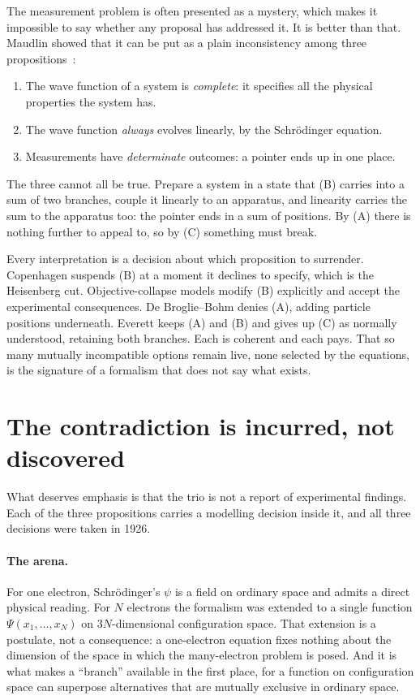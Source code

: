 \documentclass[11pt]{article}
\begin{document}
The measurement problem is often presented as a mystery, which makes it impossible to say whether
any proposal has addressed it. It is better than that. Maudlin showed that it can be put as a
plain inconsistency among three propositions~\cite{Maudlin1995}:

\begin{enumerate}\itemsep3pt
\item[(A)] The wave function of a system is \emph{complete}: it specifies all the physical
properties the system has.
\item[(B)] The wave function \emph{always} evolves linearly, by the Schr\"odinger equation.
\item[(C)] Measurements have \emph{determinate} outcomes: a pointer ends up in one place.
\end{enumerate}

The three cannot all be true. Prepare a system in a state that (B) carries into a sum of two
branches, couple it linearly to an apparatus, and linearity carries the sum to the apparatus too:
the pointer ends in a sum of positions. By (A) there is nothing further to appeal to, so by (C)
something must break.

Every interpretation is a decision about which proposition to surrender. Copenhagen suspends (B)
at a moment it declines to specify, which is the Heisenberg cut. Objective-collapse models modify
(B) explicitly and accept the experimental consequences. De Broglie--Bohm denies (A), adding
particle positions underneath. Everett keeps (A) and (B) and gives up (C) as normally understood,
retaining both branches. Each is coherent and each pays. That so many mutually incompatible options
remain live, none selected by the equations, is the signature of a formalism that does not say what
exists.

\section{The contradiction is incurred, not discovered}\label{sec:incurred}

What deserves emphasis is that the trio is not a report of experimental findings. Each of the three
propositions carries a modelling decision inside it, and all three decisions were taken in 1926.

\paragraph{The arena.} For one electron, Schr\"odinger's $\psi$ is a field on ordinary space and
admits a direct physical reading. For $N$ electrons the formalism was extended to a single function
$\Psi(x_1,\dots,x_N)$ on $3N$-dimensional configuration space. That extension is a postulate, not a
consequence: a one-electron equation fixes nothing about the dimension of the space in which the
many-electron problem is posed. And it is what makes a ``branch'' available in the first place, for
a function on configuration space can superpose alternatives that are mutually exclusive in
ordinary space.
\end{document}
